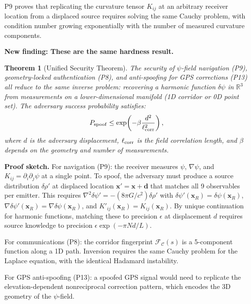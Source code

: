 \documentclass[aps,prd,twocolumn,superscriptaddress,nofootinbib]{revtex4-2}
\newtheorem{theorem}{Theorem}
\begin{document}
P9 proves that replicating the curvature tensor $K_{ij}$ at an arbitrary
receiver location from a displaced source requires solving the same
Cauchy problem, with condition number growing exponentially with the
number of measured curvature components.

\textbf{New finding: These are the same hardness result.}

\begin{theorem}[Unified Security Theorem]
The security of $\psi$-field navigation (P9), geometry-locked
authentication (P8), and anti-spoofing for GPS corrections (P13) all
reduce to the same inverse problem: recovering a harmonic function
$\delta\psi$ in $\mathbb{R}^3$ from measurements on a lower-dimensional
manifold (1D corridor or 0D point set).  The adversary success
probability satisfies:
\begin{equation}
P_{\rm spoof} \leq \exp\!\left(-\beta\frac{d^2}{\ell_{\rm corr}^2}\right),
\end{equation}
where $d$ is the adversary displacement, $\ell_{\rm corr}$ is the field
correlation length, and $\beta$ depends on the geometry and number of
measurements.
\end{theorem}

\textbf{Proof sketch.}  For navigation (P9): the receiver measures
$\psi$, $\nabla\psi$, and $K_{ij} = \partial_i\partial_j\psi$ at a
single point.  To spoof, the adversary must produce a source distribution
$\delta\rho'$ at displaced location $\mathbf{x}' = \mathbf{x} + \mathbf{d}$
that matches all 9 observables per emitter.  This requires
$\nabla^2\delta\psi' = -(8\pi G/c^2)\delta\rho'$ with
$\delta\psi'(\mathbf{x}_R) = \delta\psi(\mathbf{x}_R)$,
$\nabla\delta\psi'(\mathbf{x}_R) = \nabla\delta\psi(\mathbf{x}_R)$,
and $K'_{ij}(\mathbf{x}_R) = K_{ij}(\mathbf{x}_R)$.
By unique continuation for harmonic functions, matching these to
precision $\epsilon$ at displacement $d$ requires source knowledge to
precision $\epsilon\exp(-\pi Nd/L)$.

For communications (P8): the corridor fingerprint
$\mathcal{F}_{\mathcal{C}}(s)$ is a 5-component function along a 1D
path.  Inversion requires the same Cauchy problem for the Laplace
equation, with the identical Hadamard instability.

For GPS anti-spoofing (P13): a spoofed GPS signal would need to
replicate the elevation-dependent nonreciprocal correction pattern,
which encodes the 3D geometry of the $\psi$-field.
\end{document}
